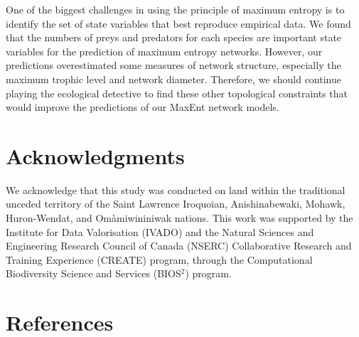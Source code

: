 \documentclass[11pt]{article}
\begin{document}
One of the biggest challenges in using the principle of maximum entropy
is to identify the set of state variables that best reproduce empirical
data. We found that the numbers of preys and predators for each species
are important state variables for the prediction of maximum entropy
networks. However, our predictions overestimated some measures of
network structure, especially the maximum trophic level and network
diameter. Therefore, we should continue playing the ecological detective
to find these other topological constraints that would improve the
predictions of our MaxEnt network models.

\hypertarget{acknowledgments}{%
\section{Acknowledgments}\label{acknowledgments}}

We acknowledge that this study was conducted on land within the
traditional unceded territory of the Saint Lawrence Iroquoian,
Anishinabewaki, Mohawk, Huron-Wendat, and Omàmiwininiwak nations. This
work was supported by the Institute for Data Valorisation (IVADO) and
the Natural Sciences and Engineering Research Council of Canada (NSERC)
Collaborative Research and Training Experience (CREATE) program, through
the Computational Biodiversity Science and Services (BIOS\(^2\))
program.

\hypertarget{references}{%
\section*{References}\label{references}}
\end{document}
